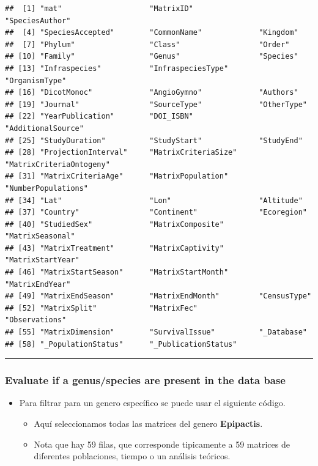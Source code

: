 \documentclass[
]{book}
\providecommand{\tightlist}{%
  \setlength{\itemsep}{0pt}\setlength{\parskip}{0pt}}
\theoremstyle{definition}
\theoremstyle{definition}
\theoremstyle{definition}
\theoremstyle{definition}
\theoremstyle{remark}
\begin{document}
\begin{verbatim}
##  [1] "mat"                    "MatrixID"               "SpeciesAuthor"         
##  [4] "SpeciesAccepted"        "CommonName"             "Kingdom"               
##  [7] "Phylum"                 "Class"                  "Order"                 
## [10] "Family"                 "Genus"                  "Species"               
## [13] "Infraspecies"           "InfraspeciesType"       "OrganismType"          
## [16] "DicotMonoc"             "AngioGymno"             "Authors"               
## [19] "Journal"                "SourceType"             "OtherType"             
## [22] "YearPublication"        "DOI_ISBN"               "AdditionalSource"      
## [25] "StudyDuration"          "StudyStart"             "StudyEnd"              
## [28] "ProjectionInterval"     "MatrixCriteriaSize"     "MatrixCriteriaOntogeny"
## [31] "MatrixCriteriaAge"      "MatrixPopulation"       "NumberPopulations"     
## [34] "Lat"                    "Lon"                    "Altitude"              
## [37] "Country"                "Continent"              "Ecoregion"             
## [40] "StudiedSex"             "MatrixComposite"        "MatrixSeasonal"        
## [43] "MatrixTreatment"        "MatrixCaptivity"        "MatrixStartYear"       
## [46] "MatrixStartSeason"      "MatrixStartMonth"       "MatrixEndYear"         
## [49] "MatrixEndSeason"        "MatrixEndMonth"         "CensusType"            
## [52] "MatrixSplit"            "MatrixFec"              "Observations"          
## [55] "MatrixDimension"        "SurvivalIssue"          "_Database"             
## [58] "_PopulationStatus"      "_PublicationStatus"
\end{verbatim}

\begin{center}\rule{0.5\linewidth}{0.5pt}\end{center}

\subsubsection{Evaluate if a genus/species are present in the data base}\label{evaluate-if-a-genusspecies-are-present-in-the-data-base}

\begin{itemize}
\tightlist
\item
  Para filtrar para un genero específico se puede usar el siguiente código.

  \begin{itemize}
  \tightlist
  \item
    Aquí seleccionamos todas las matrices del genero \textbf{Epipactis}.
  \item
    Nota que hay 59 filas, que corresponde tipicamente a 59 matrices de diferentes poblaciones, tiempo o un análisis teóricos.
  \end{itemize}
\end{itemize}
\end{document}
